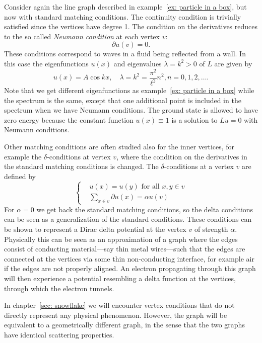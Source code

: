 \begin{example}
  Consider again the line graph described in example~\ref{ex: particle in a box}, but now with standard matching conditions. The continuity condition is trivially satisfied since the vertices have degree 1. The condition on the derivatives reduces to the so called \emph{Neumann condition} at each vertex $v$:
  \[ \partial u(v) = 0. \]
  These conditions correspond to waves in a fluid being reflected from a wall. In this case the eigenfunctions $u(x)$ and eigenvalues $\lambda = k^2 > 0$ of $L$ are given by
  \[ u(x) = A \cos kx, \quad \lambda = k^2 = \frac{\pi^2}{\ell^2}n^2, n=0,1,2,\ldots. \]
  Note that we get different eigenfunctions as example~\ref{ex: particle in a box} while the spectrum is the same, except that one additional point is included in the spectrum when we have Neumann conditions. The ground state is allowed to have zero energy because the constant function $u(x) \equiv 1$ is a solution to $Lu=0$ with Neumann conditions.
\end{example}


Other matching conditions are often studied also for the inner vertices, for example the $\delta$-conditions at vertex $v$, where the condition on the derivatives in the standard matching conditions is changed. The $\delta$-conditions at a vertex $v$ are defined by
\begin{equation}
  \left\lbrace\begin{aligned}
    &u(x) = u(y) \text{ for all } x, y \in v\\
    &\sum_{x \in v} \partial u(x) = \alpha u(v)
  \end{aligned}\right.
\end{equation}
For $\alpha = 0$ we get back the standard matching conditions, so the delta conditions can be seen as a generalization of the standard conditions. These conditions can be shown to represent a Dirac delta potential at the vertex $v$ of strength $\alpha$. Physically this can be seen as an approximation of a graph where the edges consist of conducting material---say thin metal wires---such that the edges are connected at the vertices via some thin non-conducting interface, for example air if the edges are not properly aligned. An electron propagating through this graph will then experience a potential resembling a delta function at the vertices, through which the electron tunnels.

In chapter~\ref{sec: snowflake} we will encounter vertex conditions that do not directly represent any physical phenomenon. However, the graph will be equivalent to a geometrically different graph, in the sense that the two graphs have identical scattering properties.

